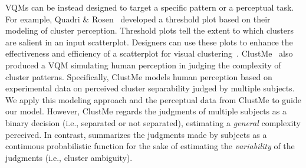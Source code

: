 VQMs can be instead designed to target a specific pattern or a perceptual task. For example, 
Quadri \& Rosen~\cite{quadri21tvcg}
developed a threshold plot based on their modeling of cluster perception.
Threshold plots tell the extent to which clusters are salient in an input scatterplot.
Designers can use these plots to 
enhance the effectiveness and efficiency of a scatterplot for visual clustering~\cite{quadri22tvcg}. 
ClustMe~\cite{abbas19cgf} also produced a VQM
simulating human perception in judging the complexity of cluster patterns. Specifically, ClustMe models human perception based on 
experimental data on perceived cluster separability judged by multiple subjects. 
We 
apply this modeling approach and the perceptual data from ClustMe to guide our model.
However, ClustMe regards the judgments of multiple subjects as a binary decision (i.e., separated or not separated), estimating a \textit{general} complexity perceived. In contrast,
\measure summarizes the judgments made by subjects as a continuous probabilistic function for the sake of estimating the \textit{variability} of the judgments  (i.e., cluster ambiguity).





